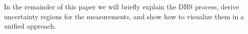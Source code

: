 \documentclass[review]{vgtc}                 %
\begin{document}

In the remainder of this paper we will briefly explain the DBS process, derive uncertainty regions for the measurements, and show how to visualize them in a unified approach.

%
%
%
%
%
\end{document}
